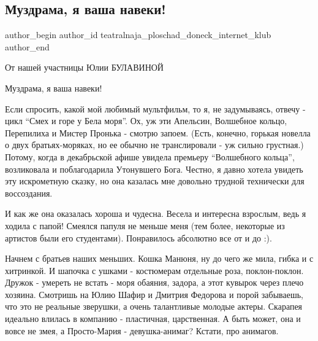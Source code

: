  
 
 
 
 
\subsection{Муздрама, я ваша навеки!}
\label{sec:07_01_2022.vk.teatralnaja_ploschad_doneck_internet_klub.1.muzdrama}

\ifcmt
 author_begin
   author_id teatralnaja_ploschad_doneck_internet_klub
 author_end
\fi

От нашей участницы Юлии БУЛАВИНОЙ

Муздрама, я ваша навеки!

Если спросить, какой мой любимый мультфильм, то я, не задумываясь, отвечу -
цикл \enquote{Смех и горе у Бела моря}. Ох, уж эти Апельсин, Волшебное кольцо,
Перепилиха и Мистер Пронька - смотрю запоем. (Есть, конечно, горькая новелла о
двух братьях-моряках, но ее обычно не транслировали - уж сильно грустная.)
Потому, когда в декабрьской афише увидела премьеру \enquote{Волшебного кольца},
возликовала и поблагодарила Утонувшего Бога. Честно, я давно хотела увидеть эту
искрометную сказку, но она казалась мне довольно трудной технически для
воссоздания.


И как же она оказалась хороша и чудесна. Весела и интересна взрослым, ведь я
ходила с папой! Смеялся папуля не меньше меня (тем более, некоторые из артистов
были его студентами). Понравилось абсолютно все от и до :).

Начнем с братьев наших меньших. Кошка Манюня, ну до чего же мила, гибка и с
хитринкой. И шапочка с ушками - костюмерам отдельные роза, поклон-поклон.
Дружок - умереть не встать - моря обаяния, задора, а этот кувырок через плечо
хозяина. Смотришь на Юлию Шафир и Дмитрия Федорова и порой забываешь, что это
не реальные зверушки, а очень талантливые молодые актеры. Скарапея идеально
влилась в компанию - пластичная, царственная. А быть может, она и вовсе не
змея, а Просто-Мария - девушка-анимаг? Кстати, про анимагов.

